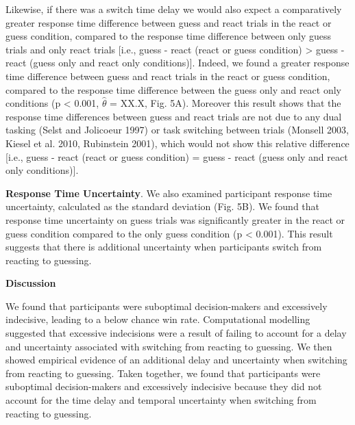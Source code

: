 \documentclass[12pt,letterpaper]{article}
\begin{document}
Likewise, if there was a switch time delay we would also expect a comparatively greater response time difference between guess and react trials in the react or guess condition, compared to the response time difference between only guess trials and only react trials [i.e., guess - react (react or guess condition) > guess - react (guess only and react only conditions)]. Indeed, we found a greater response time difference between guess and react trials in the react or guess condition, compared to the response time difference between the guess only and react only conditions (p < 0.001, $\hat{\theta}$ = XX.X, Fig. 5A). Moreover this result shows that the response time differences between guess and react trials are not due to any dual tasking (Selst and Jolicoeur 1997) or task switching between trials (Monsell 2003, Kiesel et al. 2010, Rubinstein 2001), which would not show this relative difference  [i.e., guess - react (react or guess condition) = guess - react (guess only and react only conditions)].

\textbf{Response Time Uncertainty}. We also examined participant response time uncertainty, calculated as the standard deviation (Fig. 5B). We found that response time uncertainty on guess trials was significantly greater in the react or guess condition compared to the only guess condition (p < 0.001). This result suggests that there is additional uncertainty when participants switch from reacting to guessing.



\noindent\textbf{\large\textcolor{mydarkblue}{Discussion}}

We found that participants were suboptimal decision-makers and excessively indecisive, leading to a below chance win rate. Computational modelling suggested that excessive indecisions were a result of failing to account for a delay and uncertainty associated with switching from reacting to guessing. We then showed empirical evidence of an additional delay and uncertainty when switching from reacting to guessing. Taken together, we found that participants were suboptimal decision-makers and excessively indecisive because they did not account for the time delay and temporal uncertainty when switching from reacting to guessing.
\end{document}
